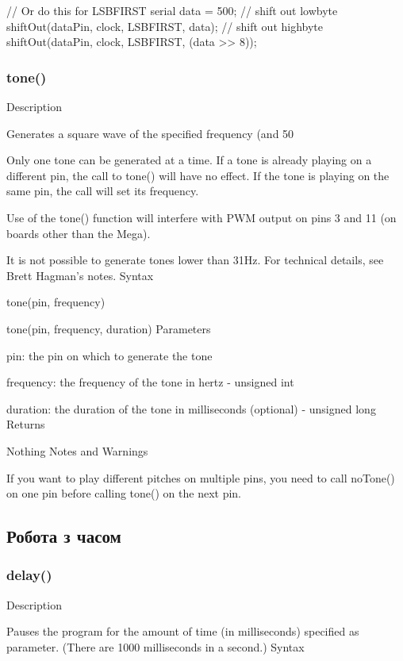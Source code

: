 \documentclass[12pt,a4paper]{report}  %
\begin{document}
// Or do this for LSBFIRST serial
data = 500;
// shift out lowbyte
shiftOut(dataPin, clock, LSBFIRST, data);
// shift out highbyte
shiftOut(dataPin, clock, LSBFIRST, (data >> 8));

\subsubsection{tone()}\label{tone}


Description

Generates a square wave of the specified frequency (and 50%

Only one tone can be generated at a time. If a tone is already playing on a different pin, the call to tone() will have no effect. If the tone is playing on the same pin, the call will set its frequency.

Use of the tone() function will interfere with PWM output on pins 3 and 11 (on boards other than the Mega).

It is not possible to generate tones lower than 31Hz. For technical details, see Brett Hagman’s notes.
Syntax

tone(pin, frequency)

tone(pin, frequency, duration)
Parameters

pin: the pin on which to generate the tone

frequency: the frequency of the tone in hertz - unsigned int

duration: the duration of the tone in milliseconds (optional) - unsigned long
Returns

Nothing
Notes and Warnings

If you want to play different pitches on multiple pins, you need to call noTone() on one pin before calling tone() on the next pin.


\subsection{Робота з часом}

\subsubsection{delay()}\label{delay()}


Description

Pauses the program for the amount of time (in milliseconds) specified as parameter. (There are 1000 milliseconds in a second.)
Syntax
\end{document}
